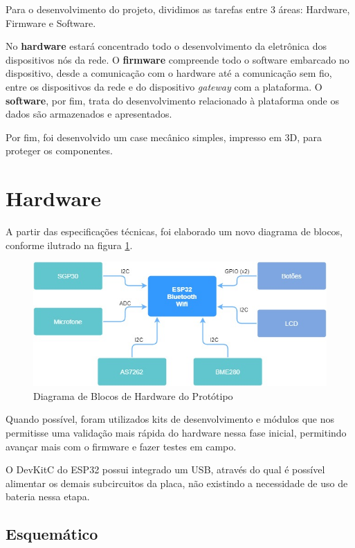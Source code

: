 \documentclass[../monografia.tex]{subfiles}
\begin{document}
Para o desenvolvimento do projeto, dividimos as tarefas entre 3 áreas: Hardware, Firmware e Software. 

No \textbf{hardware} estará concentrado todo o desenvolvimento da eletrônica dos dispositivos nós da rede. 
O \textbf{firmware} compreende todo o software embarcado no dispositivo, desde a comunicação com o hardware até a comunicação sem fio, entre os dispositivos da rede e do dispositivo \textit{gateway} com a plataforma. 
O \textbf{software}, por fim, trata do desenvolvimento relacionado à plataforma onde os dados são armazenados e apresentados. 

Por fim, foi desenvolvido um case mecânico simples, impresso em 3D, para proteger os componentes. 

\section{Hardware}

A partir das especificações técnicas, foi elaborado um novo diagrama de blocos, conforme ilutrado na figura \ref{fig:diagrama-hw}.

\begin{figure}[h]
    \centering
    \includegraphics[width=12cm]{diagrama_hw_v1}
    \caption{Diagrama de Blocos de Hardware do Protótipo}
    \label{fig:diagrama-hw}
\end{figure}

Quando possível, foram utilizados kits de desenvolvimento e módulos que nos permitisse uma validação mais rápida do hardware nessa fase inicial, permitindo avançar mais com o firmware e fazer testes em campo. 

O DevKitC do ESP32 possui integrado um USB, através do qual é possível alimentar os demais subcircuitos da placa, não existindo a necessidade de uso de bateria nessa etapa. 

\subsection{Esquemático}
\end{document}
